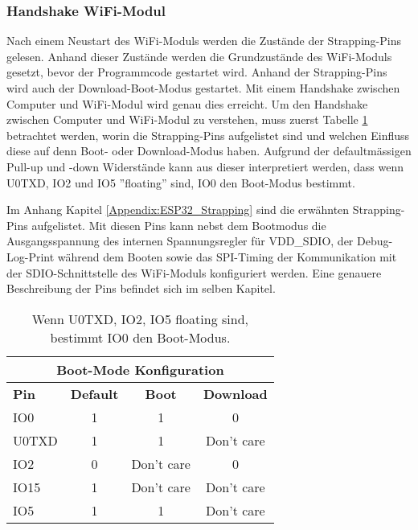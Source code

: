 
\subsubsection{Handshake WiFi-Modul}\label{subsubsec:Handshake_ESP32}
Nach einem Neustart des WiFi-Moduls werden die Zustände der Strapping-Pins gelesen. Anhand dieser Zustände werden die Grundzustände des WiFi-Moduls gesetzt, bevor der Programmcode gestartet wird. Anhand der Strapping-Pins wird auch der Download-Boot-Modus gestartet. Mit einem Handshake zwischen Computer und WiFi-Modul wird genau dies erreicht.
Um den Handshake zwischen Computer und WiFi-Modul zu verstehen, muss zuerst Tabelle \ref{tab:Einfluss_Pins_auf_Boot_Modus} betrachtet werden, worin die Strapping-Pins aufgelistet sind und welchen Einfluss diese auf denn Boot- oder Download-Modus haben. Aufgrund der defaultmässigen Pull-up und -down Widerstände kann aus dieser interpretiert werden, dass wenn U0TXD, IO2 und IO5 ''floating'' sind, IO0 den Boot-Modus bestimmt. \cite[S.12-S.14]{espressif_systems_esp32_2016}


Im Anhang Kapitel \ref{Appendix:ESP32_Strapping} sind die erwähnten Strapping-Pins aufgelistet. Mit diesen Pins kann nebst dem Bootmodus die Ausgangsspannung des internen Spannungsregler für VDD\_SDIO, der Debug-Log-Print während dem Booten sowie das SPI-Timing der Kommunikation mit der SDIO-Schnittstelle des WiFi-Moduls konfiguriert werden. Eine genauere Beschreibung der Pins befindet sich im selben Kapitel.

\begin{table}[H]
\center
\begin{tabular}{|l|c|c|c|}
\hline
\multicolumn{4}{|c|}{\textbf{Boot-Mode Konfiguration}}\\
\hline
\textbf{Pin} & \textbf{Default} & \textbf{Boot} & \textbf{Download} \\
\hline
IO0 & 1 & 1 & 0 \\
\hline
U0TXD & 1 & 1 & Don't care \\
\hline
IO2 & 0 & Don't care & 0 \\
\hline
IO15 & 1 & Don't care & Don't care \\
\hline
IO5 & 1 & 1 & Don't care \\
\hline
\end{tabular}
\caption{Wenn U0TXD, IO2, IO5 floating sind, bestimmt IO0 den Boot-Modus.}
\label{tab:Einfluss_Pins_auf_Boot_Modus}
\end{table}